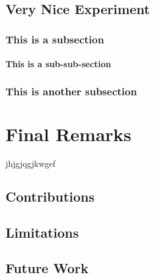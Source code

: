 \documentclass[11pt, a4paper]{report}
\begin{document}
\section{Very Nice Experiment}

\subsection{This is a subsection}

\subsubsection{This is a sub-sub-section}

\subsection{This is another subsection}


\chapter{Final Remarks}
jhjgjqgjkwgef

\section{Contributions}

\section{Limitations}

\section{Future Work}





\end{document}
